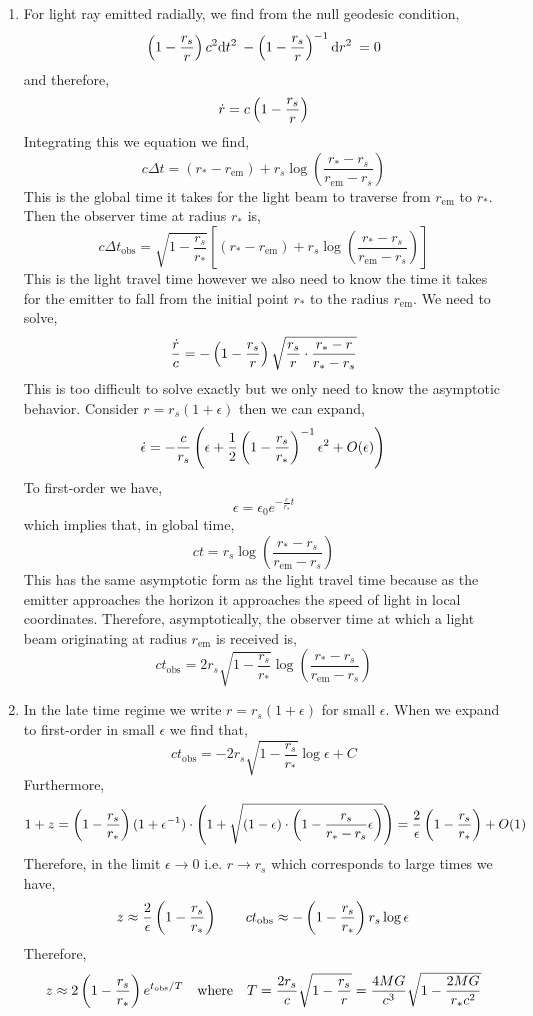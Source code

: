 \documentclass[12pt]{article}
\begin{document}
\begin{enumerate}
\item For light ray emitted radially, we find from the null geodesic condition,
\[ \left( 1 - \frac{r_s}{r} \right) c^2 \mathrm{d}t^2 \: - \left( 1 - \frac{r_s}{r} \right)^{-1} \mathrm{d}r^2 \: = 0 \]
and therefore,
\[ \dot{r} = c \left( 1 - \frac{r_s}{r} \right) \]
Integrating this we equation we find,
\[ c \Delta t = (r_* - r_{\text{em}}) + r_s \log{\left( \frac{r_* - r_s}{r_{\text{em}} - r_s}\right)} \]
This is the global time it takes for the light beam to traverse from $r_{\text{em}}$ to $r_*$. Then the observer time at radius $r_*$ is,
\[ c \Delta t_{\text{obs}} = \sqrt{1 - \frac{r_s}{r_*}} \left[(r_* - r_{\text{em}}) + r_s \log{\left( \frac{r_* - r_s}{r_{\text{em}} - r_s}\right)} \right] \]
This is the light travel time however we also need to know the time it takes for the emitter to fall from the initial point $r_*$ to the radius $r_{\text{em}}$. We need to solve,
\[ \frac{\dot{r}}{c} = -\left( 1 - \frac{r_s}{r} \right) \sqrt{\frac{r_s}{r} \cdot \frac{r_* - r}{r_* - r_s}} \]
This is too difficult to solve exactly but we only need to know the asymptotic behavior. Consider $r = r_s(1 + \epsilon)$ then we can expand,
\[ \dot{\epsilon} = - \frac{c}{r_s} \left( \epsilon + \frac{1}{2} \left( 1 - \frac{r_s}{r_*} \right)^{-1} \epsilon^2 + O(\epsilon) \right) \]
To first-order we have,
\[ \epsilon = \epsilon_0 e^{- \frac{c}{r_s} t} \]
which implies that, in global time,
\[ ct = r_s \log{\left( \frac{r_* - r_s}{r_{\text{em}} - r_s} \right)} \]
This has the same asymptotic form as the light travel time because as the emitter approaches the horizon it approaches the speed of light in  local coordinates. Therefore, asymptotically, the observer time at which a light beam originating at radius $r_{\text{em}}$ is received is,
\[ c t_{\text{obs}} = 2 r_s \sqrt{1 - \frac{r_s}{r_*}} \log{\left( \frac{r_* - r_s}{r_{\text{em}} - r_s} \right)} \]

\item In the late time regime we write $r = r_s(1 + \epsilon)$ for small $\epsilon$. When we expand to first-order in small $\epsilon$ we  find that,
\[ c t_{\text{obs}} = -2 r_s \sqrt{1 - \frac{r_s}{r_*}} \log{\epsilon} + C \]
Furthermore,
\[ 1 + z = \left( 1 - \frac{r_s}{r_*} \right) (1 + \epsilon^{-1}) \cdot \left(1 + \sqrt{(1 - \epsilon) \cdot \left(1 - \frac{r_s}{r_* - r_s} \epsilon \right)} \right) = \frac{2}{\epsilon} \left( 1 - \frac{r_s}{r_*} \right) + O(1)   \]
Therefore, in the limit $\epsilon \to 0$ i.e. $r \to r_s$ which corresponds to large times we have,
\[ z \approx \frac{2}{\epsilon} \left( 1 - \frac{r_s}{r_*} \right) \quad \quad c t_{\text{obs}} \approx - \left( 1 - \frac{r_s}{r_*} \right) r_s \log{\epsilon} \]
Therefore,
\[ z \approx 2 \left( 1 - \frac{r_s}{r_*} \right) e^{t_{\text{obs}} / T} \quad \text{where} \quad T = \frac{2r_s}{c} \sqrt{1 - \frac{r_s}{r}} = \frac{4 MG}{c^3} \sqrt{1 - \frac{2 MG}{r_* c^2}} \]
\end{enumerate}
\end{document}
